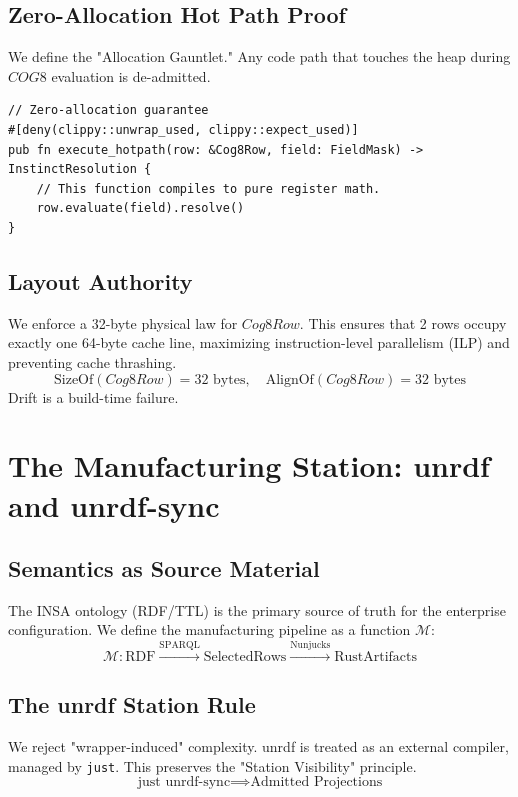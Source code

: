 \documentclass[12pt,a4paper,oneside]{book}
\begin{document}
\section{Zero-Allocation Hot Path Proof}
We define the "Allocation Gauntlet." Any code path that touches the heap during $COG8$ evaluation is de-admitted.
\begin{lstlisting}
// Zero-allocation guarantee
#[deny(clippy::unwrap_used, clippy::expect_used)]
pub fn execute_hotpath(row: &Cog8Row, field: FieldMask) -> InstinctResolution {
    // This function compiles to pure register math.
    row.evaluate(field).resolve()
}
\end{lstlisting}

\section{Layout Authority}
We enforce a 32-byte physical law for $Cog8Row$. This ensures that 2 rows occupy exactly one 64-byte cache line, maximizing instruction-level parallelism (ILP) and preventing cache thrashing.
\begin{equation}
\text{SizeOf}(Cog8Row) = 32 \text{ bytes}, \quad \text{AlignOf}(Cog8Row) = 32 \text{ bytes}
\end{equation}
Drift is a build-time failure.

\chapter{The Manufacturing Station: unrdf and unrdf-sync}

\section{Semantics as Source Material}
The INSA ontology (RDF/TTL) is the primary source of truth for the enterprise configuration. We define the manufacturing pipeline as a function $\mathcal{M}$:
\begin{equation}
\mathcal{M}: \text{RDF} \xrightarrow{\text{SPARQL}} \text{SelectedRows} \xrightarrow{\text{Nunjucks}} \text{RustArtifacts}
\end{equation}

\section{The unrdf Station Rule}
We reject "wrapper-induced" complexity. unrdf is treated as an external compiler, managed by \texttt{just}. This preserves the "Station Visibility" principle.
\begin{equation}
\text{just unrdf-sync} \implies \text{Admitted Projections}
\end{equation}
\end{document}
